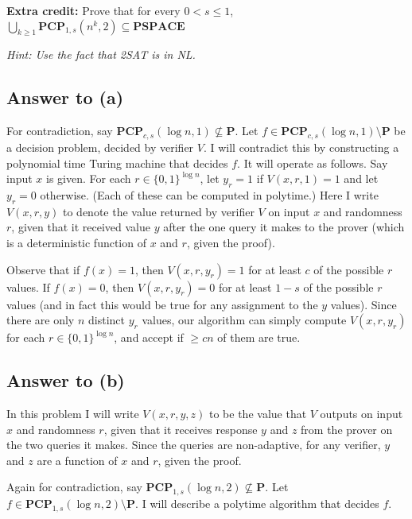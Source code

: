 \documentclass{article}
\renewcommand{\P}{\mathbf{P}}
\newcommand{\mf}[1]{\mathbf{#1}}
\begin{document}
\smallskip

{\bf Extra credit:} Prove that for every $0<s\leq 1$, $\bigcup_{k \geq 1} \mf{PCP}_{1,s}(n^k,2) \subseteq \mf{PSPACE}$

\smallskip

\emph{Hint: Use the fact that 2SAT is in NL.} 

\newpage
\subsection*{Answer to (a)}
For contradiction, say $\mathbf{PCP}_{c, s}(\log n, 1) \not\subseteq \P$.
Let $f \in \mathbf{PCP}_{c, s}(\log n, 1) \setminus \P$ be a decision problem,
decided by verifier $V$.
I will contradict this by constructing a polynomial time Turing machine that decides $f$.
It will operate as follows.  Say input $x$ is given.
For each $r \in \{0, 1\}^{\log n}$, let $y_r = 1$ if $V(x, r, 1) = 1$ and let $y_r = 0$ otherwise. (Each of these can be computed in polytime.) Here I write $V(x, r, y)$ to denote the value returned by verifier $V$ on input $x$ and randomness $r$, given that it received value $y$ after the one query it makes to the prover (which is a deterministic function of $x$ and $r$, given the proof).

Observe that if $f(x) = 1$, then $V(x, r, y_r) = 1$ for at least $c$ of the possible $r$ values.
If $f(x) = 0$, then $V(x, r, y_r) = 0$ for at least $1 - s$ of the possible $r$ values (and in fact this would be true for any assignment to the $y$ values).
Since there are only $n$ distinct $y_r$ values, our algorithm can simply compute $V(x, r, y_r)$ for each $r \in \{0, 1\}^{\log n}$, and accept if $\geq cn$ of them are true.

\subsection*{Answer to (b)}
In this problem I will write $V(x, r, y, z)$ to be the value that $V$ outputs on input $x$ and randomness $r$, given that it receives response $y$ and $z$ from the prover on the two queries it makes.  Since the queries are non-adaptive, for any verifier, $y$ and $z$ are a function of $x$ and $r$, given the proof.

Again for contradiction, say $\mathbf{PCP}_{1, s}(\log n, 2) \not\subseteq \P$.
Let $f \in \mathbf{PCP}_{1, s}(\log n, 2) \setminus \P$.
I will describe a polytime algorithm that decides $f$.
\end{document}
